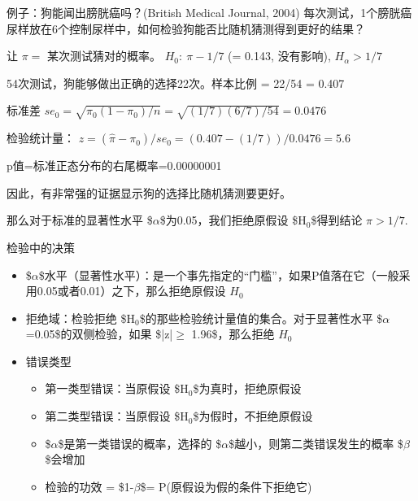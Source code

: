 \documentclass[presentation]{beamer}
\begin{document}
\begin{frame}[label={sec:orgaf163ca}]{例子：狗能闻出膀胱癌吗？(British Medical Journal, 2004)}
每次测试，1个膀胱癌尿样放在6个控制尿样中，如何检验狗能否比随机猜测得到更好的结果？

让 \(\pi=\) 某次测试猜对的概率。 \(H_0: \ \pi-1/7\) (= 0.143, 没有影响),  \(H_{\alpha}>1/7\)

54次测试，狗能够做出正确的选择22次。样本比例 = 22/54 = 0.407

标准差 \(se_0=\sqrt{\pi_0(1-\pi_0)/n}=\sqrt{(1/7)(6/7)/54}=0.0476\)

检验统计量： \(z=(\hat \pi-\pi_0)/se_0=(0.407-(1/7))/0.0476=5.6\)

p值=标准正态分布的右尾概率=0.00000001

因此，有非常强的证据显示狗的选择比随机猜测要更好。

那么对于标准的显著性水平 \$\(\alpha\)\$为0.05，我们拒绝原假设 \$H\(_{\text{0}}\)\$得到结论 \(\pi>1/7\).
\end{frame}

\begin{frame}[label={sec:org4180e2a}]{检验中的决策}
\begin{itemize}
\item \$\(\alpha\)\$水平（显著性水平）：是一个事先指定的“门槛”，如果P值落在它（一般采用0.05或者0.01）之下，那么拒绝原假设 \(H_0\)

\item 拒绝域：检验拒绝 \$H\(_{\text{0}}\)\$的那些检验统计量值的集合。对于显著性水平 \$\(\alpha\)=0.05\$的双侧检验，如果 \$|z|\(\ge\) 1.96\$，那么拒绝 \(H_0\)

\item 错误类型
\begin{itemize}
\item 第一类型错误：当原假设 \$H\(_{\text{0}}\)\$为真时，拒绝原假设

\item 第二类型错误：当原假设 \$H\(_{\text{0}}\)\$为假时，不拒绝原假设

\item \$\(\alpha\)\$是第一类错误的概率，选择的 \$\(\alpha\)\$越小，则第二类错误发生的概率 \$\(\beta\)\$会增加

\item 检验的功效 = \$1-\(\beta\)\$= P(原假设为假的条件下拒绝它)
\end{itemize}
\end{itemize}
\end{frame}
\end{document}
